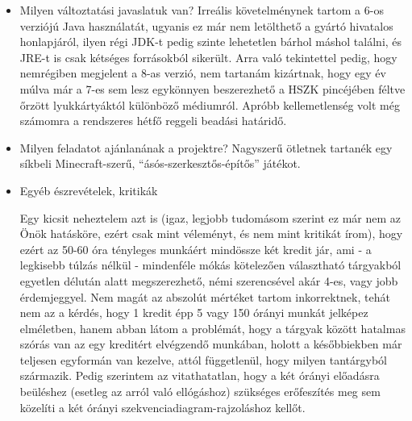 \begin{itemize}
\item Milyen változtatási javaslatuk van? \newline
Irreális követelménynek tartom a 6-os verziójú Java használatát, ugyanis ez már nem letölthető a gyártó hivatalos honlapjáról, ilyen régi JDK-t pedig szinte lehetetlen bárhol máshol találni, és JRE-t is csak kétséges forrásokból sikerült. Arra való tekintettel pedig, hogy nemrégiben megjelent a 8-as verzió, nem tartanám kizártnak, hogy egy év múlva már a 7-es sem lesz egykönnyen beszerezhető a HSZK pincéjében féltve őrzött lyukkártyáktól különböző médiumról.
Apróbb kellemetlenség volt még számomra a rendszeres hétfő reggeli beadási határidő.

\item Milyen feladatot ajánlanának a projektre? \newline
Nagyszerű ötletnek tartanék egy síkbeli Minecraft-szerű, ``ásós-szerkesztős-építős'' játékot.

\item Egyéb észrevételek, kritikák

Egy kicsit neheztelem azt is (igaz, legjobb tudomásom szerint ez már nem az Önök hatásköre, ezért csak mint véleményt, és nem mint kritikát írom), hogy ezért az 50-60 óra tényleges munkáért mindössze két kredit jár, ami - a legkisebb túlzás nélkül - mindenféle mókás kötelezően választható tárgyakból egyetlen délután alatt megszerezhető, némi szerencsével akár 4-es, vagy jobb érdemjeggyel. Nem magát az abszolút mértéket tartom inkorrektnek, tehát nem az a kérdés, hogy 1 kredit épp 5 vagy 150 órányi munkát jelképez elméletben, hanem abban látom a problémát, hogy a tárgyak között hatalmas szórás van az egy kreditért elvégzendő munkában, holott a későbbiekben már teljesen egyformán van kezelve, attól függetlenül, hogy milyen tantárgyból származik. Pedig szerintem az vitathatatlan, hogy a két órányi előadásra beüléshez (esetleg az arról való ellógáshoz) szükséges erőfeszítés meg sem közelíti a két órányi szekvenciadiagram-rajzoláshoz kellőt.

\end{itemize}


